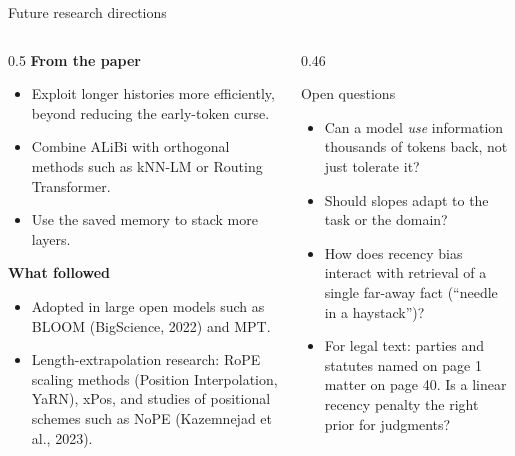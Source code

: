 \documentclass[aspectratio=169,11pt]{beamer}
\begin{document}
\begin{frame}{Future research directions}
  \begin{columns}[T]
    \begin{column}{0.5\textwidth}
      \small
      \textbf{From the paper}
      \begin{itemize}
        \item Exploit longer histories more efficiently, beyond reducing the early-token curse.
        \item Combine ALiBi with orthogonal methods such as kNN-LM or Routing Transformer.
        \item Use the saved memory to stack more layers.
      \end{itemize}
      \textbf{What followed}
      \begin{itemize}
        \item Adopted in large open models such as BLOOM (BigScience, 2022) and MPT.
        \item Length-extrapolation research: RoPE scaling methods (Position Interpolation, YaRN), xPos, and studies of positional schemes such as NoPE (Kazemnejad et al., 2023).
      \end{itemize}
    \end{column}
    \begin{column}{0.46\textwidth}
      \begin{block}{Open questions}
        \small
        \begin{itemize}
          \item Can a model \emph{use} information thousands of tokens back, not just tolerate it?
          \item Should slopes adapt to the task or the domain?
          \item How does recency bias interact with retrieval of a single far-away fact (``needle in a haystack'')?
          \item For legal text: parties and statutes named on page 1 matter on page 40. Is a linear recency penalty the right prior for judgments?
        \end{itemize}
      \end{block}
    \end{column}
  \end{columns}
\end{frame}
\end{document}
